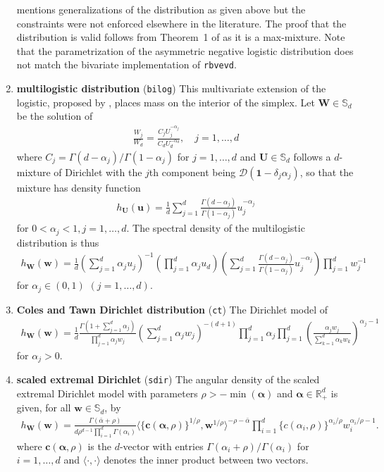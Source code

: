 \documentclass{article}\usepackage[]{graphicx}\usepackage[]{xcolor}
\newcommand{\bs}[1]{\boldsymbol {#1}}
\newcommand{\R}{\mathbb{R}}
\newcommand{\code}[1]{\texttt{#1}}
\begin{document}
\begin{enumerate}
\cite{Joe:1990} mentions generalizations of the distribution as given above but the constraints were not enforced elsewhere in the literature. The proof that the distribution is valid follows from Theorem~1 of \cite{Stephenson:2003} as it is a max-mixture.  Note that the parametrization of the asymmetric negative logistic distribution  does not match the bivariate implementation of \code{rbvevd}.
\item \textbf{multilogistic distribution} (\code{bilog})
This multivariate extension of the logistic, proposed by \cite{Boldi:2009}, places mass on the interior of the simplex. Let $\bs{W} \in \mathbb{S}_d$ be the solution of
\begin{align*}
 \frac{W_j}{W_d}=\frac{C_jU_j^{-\alpha_j}}{C_dU_d^{-\alpha_d}}, \quad j=1, \ldots, d
\end{align*}
where $C_j=\Gamma(d-\alpha_j)/\Gamma(1-\alpha_j)$ for $j=1, \ldots, d$ and $\bs{U} \in \mathbb{S}_d$ follows a $d$-mixture of Dirichlet with the $j$th component being $\mathcal{D}(\bs{1}-\delta_{j}\alpha_j)$, so that the mixture has density function
\begin{align*}
 h_{\bs{U}}(\bs{u})=\frac{1}{d} \sum_{j=1}^d \frac{\Gamma(d-\alpha_j)}{\Gamma(1-\alpha_j)} u_j^{-\alpha_j}
\end{align*}
for $0<\alpha_j <1, j=1, \ldots, d$.
The
spectral density of the multilogistic distribution is thus
\begin{align*}
   h_{\bs{W}}(\bs{w}) = \frac{1}{d} \left(\sum_{j=1}^d \alpha_ju_j\right)^{-1} \left(\prod_{j=1}^d \alpha_ju_d
\right)\left(\sum_{j=1}^d \frac{\Gamma(d-\alpha_j)}{\Gamma(1-\alpha_j)}u_j^{-\alpha_j}\right)\prod_{j=1}^d w_j^{-1}
\end{align*}
for $\alpha_j \in (0,1)$ $(j=1, \ldots, d)$.
\item \textbf{Coles and Tawn Dirichlet distribution} (\code{ct})
The Dirichlet model of \cite{Coles:1991}
\begin{align*}
   h_{\bs{W}}(\bs{w}) = \frac{1}{d} \frac{\Gamma \left(1+\sum_{j=1}^d \alpha_j\right)}{\prod_{j=1}^d \alpha_jw_j}
\left(\sum_{j=1}^d \alpha_jw_j\right)^{-(d+1)}\prod_{j=1}^d \alpha_j \prod_{j=1}^d \left(\frac{\alpha_jw_j}{\sum_{k=1}^d
\alpha_kw_k}\right)^{\alpha_j-1}
\end{align*}
for $\alpha_j>0.$
\item \textbf{scaled extremal Dirichlet} (\code{sdir})
The angular density of the scaled extremal Dirichlet model with parameters $\rho > -\min(\bs{\alpha})$ and $\bs{\alpha} \in \R^{d}_{+}$ is given, for all $\bs{w} \in \mathbb{S}_d$, by
\begin{align*}
	h_{\bs{W}}(\bs{w})=\frac{\Gamma(\bar{\alpha}+\rho)}{d\rho^{d-1}\prod_{i=1}^d\Gamma(\alpha_i)}
\bigl\langle\{\bs{c}(\bs{\alpha},\rho)\}^{1/\rho},\bs{w}^{1/\rho}\bigr\rangle^{-\rho-\bar{\alpha}}\prod_{i=1}^{d}
\{c(\alpha_i,\rho)\}^{\alpha_i/\rho}w_i^{\alpha_i/\rho-1}.
\end{align*}
where $\bs{c}(\bs{\alpha},\rho)$ is the $d$-vector with entries  $\Gamma(\alpha_i+\rho)/\Gamma(\alpha_i)$ for $i=1, \ldots, d$ and $\langle \cdot, \cdot \rangle$ denotes the inner product between two vectors.


\end{enumerate}
\end{document}
